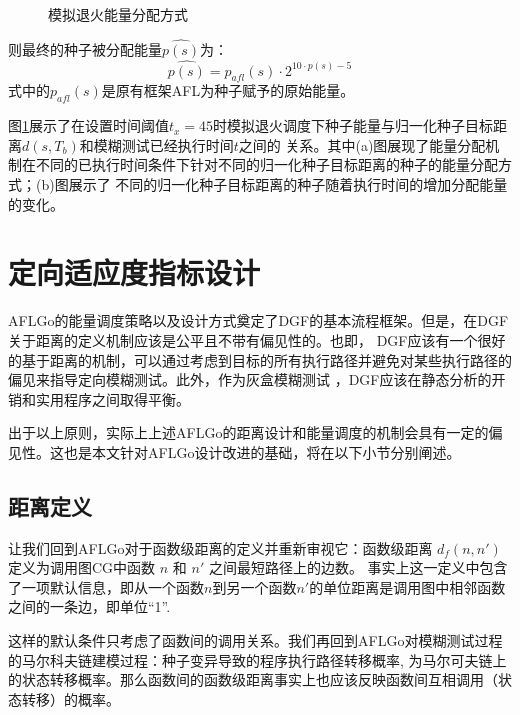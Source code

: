 \documentclass[bachelor]{njupthesis}
\begin{document}
\begin{figure}[htb]
	\centering
	\caption{模拟退火能量分配方式}
 	\label{pic:dis}
\end{figure}

则最终的种子被分配能量$\hat{p(s)}$为：
\begin{equation}
	\hat{p(s)}=p_{afl}(s)\cdot 2^{10\cdot p(s)-5}	
\end{equation}
式中的$p_{afl}(s)$是原有框架AFL为种子赋予的原始能量。

图\ref{pic:dis}展示了在设置时间阈值$t_x=45$时模拟退火调度下种子能量与归一化种子目标距离$d(s,T_b)$和模糊测试已经执行时间$t$之间的
关系。其中(a)图展现了能量分配机制在不同的已执行时间条件下针对不同的归一化种子目标距离的种子的能量分配方式；(b)图展示了
不同的归一化种子目标距离的种子随着执行时间的增加分配能量的变化。

\section{定向适应度指标设计}
AFLGo的能量调度策略以及设计方式奠定了DGF的基本流程框架。但是，在DGF关于距离的定义机制应该是公平且不带有偏见性的。也即，
DGF应该有一个很好的基于距离的机制，可以通过考虑到目标的所有执行路径并避免对某些执行路径的偏见来指导定向模糊测试。此外，作为灰盒模糊测试
，DGF应该在静态分析的开销和实用程序之间取得平衡。

出于以上原则，实际上上述AFLGo的距离设计和能量调度的机制会具有一定的偏见性。这也是本文针对AFLGo设计改进的基础，将在以下小节分别阐述。
\subsection{距离定义}\label{sec:disredefine}
让我们回到AFLGo对于函数级距离的定义并重新审视它：函数级距离 $d_f(n, n')$ 定义为调用图CG中函数 $n$ 和 $n'$ 之间最短路径上的边数。
事实上这一定义中包含了一项默认信息，即从一个函数$n$到另一个函数$n'$的单位距离是调用图中相邻函数之间的一条边，即单位“1”.

这样的默认条件只考虑了函数间的调用关系。我们再回到AFLGo对模糊测试过程的马尔科夫链建模过程：种子变异导致的程序执行路径转移概率,
为马尔可夫链上的状态转移概率。那么函数间的函数级距离事实上也应该反映函数间互相调用（状态转移）的概率。
\end{document}
